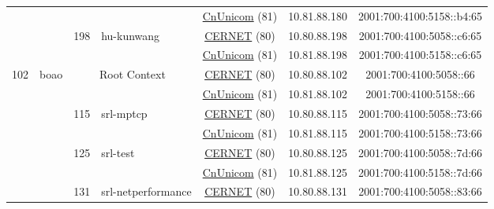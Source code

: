 \begin{small}
\begin{center}
\begin{longtable}{|c|c|c|c|c|c|c|c|}
  &  &  &  & \multicolumn{2}{|c|}{\tiny{\href{http://www.chinaunicom.com}{CnUnicom} (81)}} & \tiny{10.81.88.180} & \tiny{2001:700:4100:5158::b4:65} \\* \cline{3-3}\cline{4-4}\cline{5-5}\cline{6-6}\cline{7-7}\cline{8-8}
  &  & \multirow{2}{*}{\tiny{198}} & \multicolumn{1}{|l|}{\multirow{2}{*}{\tiny{hu-kunwang}}} & \multicolumn{2}{|c|}{\tiny{\href{http://www.cernet.edu.cn}{CERNET} (80)}} & \tiny{10.80.88.198} & \tiny{2001:700:4100:5058::c6:65} \\* \cline{5-5}\cline{6-6}\cline{7-7}\cline{8-8}
  &  &  &  & \multicolumn{2}{|c|}{\tiny{\href{http://www.chinaunicom.com}{CnUnicom} (81)}} & \tiny{10.81.88.198} & \tiny{2001:700:4100:5158::c6:65} \\ \hline
 \multirow{26}{*}{\tiny{102}} & \multicolumn{1}{|l|}{\multirow{26}{*}{\tiny{boao}}} & \multicolumn{2}{|c|}{\multirow{2}{*}{\tiny{Root Context}}} & \multicolumn{2}{|c|}{\tiny{\href{http://www.cernet.edu.cn}{CERNET} (80)}} & \tiny{10.80.88.102} & \tiny{2001:700:4100:5058::66} \\* \cline{5-5}\cline{6-6}\cline{7-7}\cline{8-8}
  &  & \multicolumn{2}{|c|}{} & \multicolumn{2}{|c|}{\tiny{\href{http://www.chinaunicom.com}{CnUnicom} (81)}} & \tiny{10.81.88.102} & \tiny{2001:700:4100:5158::66} \\* \cline{3-3}\cline{4-4}\cline{5-5}\cline{6-6}\cline{7-7}\cline{8-8}
  &  & \multirow{2}{*}{\tiny{115}} & \multicolumn{1}{|l|}{\multirow{2}{*}{\tiny{srl-mptcp}}} & \multicolumn{2}{|c|}{\tiny{\href{http://www.cernet.edu.cn}{CERNET} (80)}} & \tiny{10.80.88.115} & \tiny{2001:700:4100:5058::73:66} \\* \cline{5-5}\cline{6-6}\cline{7-7}\cline{8-8}
  &  &  &  & \multicolumn{2}{|c|}{\tiny{\href{http://www.chinaunicom.com}{CnUnicom} (81)}} & \tiny{10.81.88.115} & \tiny{2001:700:4100:5158::73:66} \\* \cline{3-3}\cline{4-4}\cline{5-5}\cline{6-6}\cline{7-7}\cline{8-8}
  &  & \multirow{2}{*}{\tiny{125}} & \multicolumn{1}{|l|}{\multirow{2}{*}{\tiny{srl-test}}} & \multicolumn{2}{|c|}{\tiny{\href{http://www.cernet.edu.cn}{CERNET} (80)}} & \tiny{10.80.88.125} & \tiny{2001:700:4100:5058::7d:66} \\* \cline{5-5}\cline{6-6}\cline{7-7}\cline{8-8}
  &  &  &  & \multicolumn{2}{|c|}{\tiny{\href{http://www.chinaunicom.com}{CnUnicom} (81)}} & \tiny{10.81.88.125} & \tiny{2001:700:4100:5158::7d:66} \\* \cline{3-3}\cline{4-4}\cline{5-5}\cline{6-6}\cline{7-7}\cline{8-8}
  &  & \multirow{2}{*}{\tiny{131}} & \multicolumn{1}{|l|}{\multirow{2}{*}{\tiny{srl-netperformance}}} & \multicolumn{2}{|c|}{\tiny{\href{http://www.cernet.edu.cn}{CERNET} (80)}} & \tiny{10.80.88.131} & \tiny{2001:700:4100:5058::83:66} \\* \cline{5-5}\cline{6-6}\cline{7-7}\cline{8-8}

\end{longtable}
\end{center}
\end{small}
